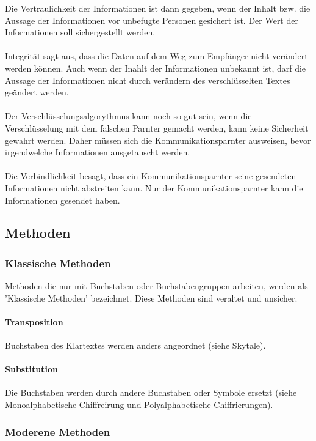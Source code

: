 \documentclass[11pt,a4paper]{report}
\begin{document}
Die Vertraulichkeit der Informationen ist dann gegeben, wenn der Inhalt bzw. die Aussage der Informationen vor unbefugte Personen gesichert ist. Der Wert der Informationen soll sichergestellt werden.\\\\
Integrität sagt aus, dass die Daten auf dem Weg zum Empfänger nicht verändert werden können. Auch wenn der Inahlt der Informationen unbekannt ist, darf die Aussage der Informationen nicht durch verändern des verschlüsselten Textes geändert werden.\\\\
Der Verschlüsselungsalgorythmus kann noch so gut sein, wenn die Verschlüsselung mit dem falschen Parnter gemacht werden, kann keine Sicherheit gewahrt werden. Daher müssen sich die Kommunikationsparnter ausweisen, bevor irgendwelche Informationen ausgetauscht werden.\\\\
Die Verbindlichkeit besagt, dass ein Kommunikationsparnter seine gesendeten Informationen nicht abstreiten kann. Nur der Kommunikationsparnter kann die Informationen gesendet haben.

\subsection{Methoden}

\subsubsection{Klassische Methoden}

Methoden die nur mit Buchstaben oder Buchstabengruppen arbeiten, werden als 'Klassische Methoden' bezeichnet. Diese Methoden sind veraltet und unsicher.

\paragraph{Transposition}

Buchstaben des Klartextes werden anders angeordnet (siehe Skytale).

\paragraph{Substitution}

Die Buchstaben werden durch andere Buchstaben oder Symbole ersetzt (siehe Monoalphabetische Chiffreirung und Polyalphabetische Chiffrierungen).

\subsubsection{Moderene Methoden}
\end{document}
